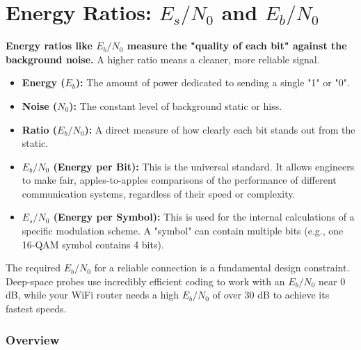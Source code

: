 
\chapter{Energy Ratios: \texorpdfstring{$E_s/N_0$ and $E_b/N_0$}{Es/N0 and Eb/N0}}
\label{ch:energy-ratios}

\begin{nontechnical}
    \textbf{Energy ratios like $E_b/N_0$ measure the "quality of each bit" against the background noise.} A higher ratio means a cleaner, more reliable signal.

    \begin{itemize}
        \item \textbf{Energy ($E_b$):} The amount of power dedicated to sending a single "1" or "0".
        \item \textbf{Noise ($N_0$):} The constant level of background static or hiss.
        \item \textbf{Ratio ($E_b/N_0$):} A direct measure of how clearly each bit stands out from the static.
    \end{itemize}

    \begin{itemize}
        \item \textbf{$E_b/N_0$ (Energy per Bit):} This is the universal standard. It allows engineers to make fair, apples-to-apples comparisons of the performance of different communication systems, regardless of their speed or complexity.
        \item \textbf{$E_s/N_0$ (Energy per Symbol):} This is used for the internal calculations of a specific modulation scheme. A "symbol" can contain multiple bits (e.g., one 16-QAM symbol contains 4 bits).
    \end{itemize}

     The required $E_b/N_0$ for a reliable connection is a fundamental design constraint. Deep-space probes use incredibly efficient coding to work with an $E_b/N_0$ near 0 dB, while your WiFi router needs a high $E_b/N_0$ of over 30 dB to achieve its fastest speeds.
\end{nontechnical}


\subsection{Overview}

